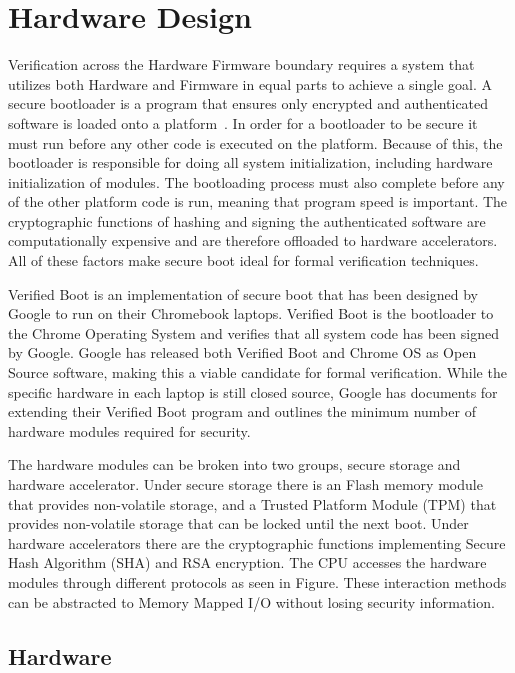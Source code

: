 \documentclass[../report.tex]{subfiles}
\begin{document}
\onehalfspacing

\section{Hardware Design}

Verification across the Hardware Firmware boundary requires a system that utilizes both Hardware and Firmware in equal parts to achieve a single goal.
A secure bootloader is a program that ensures only encrypted and authenticated software is loaded onto a platform~\cite{secure-bootloader}.
In order for a bootloader to be secure it must run before any other code is executed on the platform.
Because of this, the bootloader is responsible for doing all system initialization, including hardware initialization of modules.
The bootloading process must also complete before any of the other platform code is run, meaning that program speed is important. 
The cryptographic functions of hashing and signing the authenticated software are computationally expensive and are therefore offloaded to hardware accelerators. 
All of these factors make secure boot ideal for formal verification techniques.

Verified Boot is an implementation of secure boot that has been designed by Google to run on their Chromebook laptops.
Verified Boot is the bootloader to the Chrome Operating System and verifies that all system code has been signed by Google.
Google has released both Verified Boot and Chrome OS as Open Source software, making this a viable candidate for formal verification.
While the specific hardware in each laptop is still closed source, Google has documents for extending their Verified Boot program and outlines the minimum
number of hardware modules required for security.

The hardware modules can be broken into two groups, secure storage and hardware accelerator.
Under secure storage there is an Flash memory module that provides non-volatile storage, and a Trusted Platform Module (TPM) that provides non-volatile storage that can be locked until the next boot.
Under hardware accelerators there are the cryptographic functions implementing Secure Hash Algorithm (SHA) and RSA encryption. 
The CPU accesses the hardware modules through different protocols as seen in Figure. %
These interaction methods can be abstracted to Memory Mapped I/O without losing security information.

\subsection{Hardware}
\end{document}
